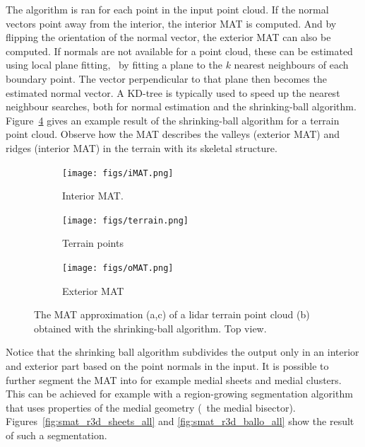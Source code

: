 The algorithm is ran for each point in the input point cloud. 
If the normal vectors point away from the interior, the interior MAT is computed.
And by flipping the orientation of the normal vector, the exterior MAT can also be computed.
If normals are not available for a point cloud, these can be estimated using local plane fitting, \ie\ by fitting a plane to the $k$ nearest neighbours of each boundary point. 
The vector perpendicular to that plane then becomes the estimated normal vector.
A KD-tree is typically used to speed up the nearest neighbour searches, both for normal estimation and the shrinking-ball algorithm.
Figure~\ref{fig:ca_ridge} gives an example result of the shrinking-ball algorithm for a terrain point cloud. 
Observe how the MAT describes the valleys (exterior MAT) and ridges (interior MAT) in the terrain with its skeletal structure.
\begin{figure}
	\centering
	\begin{subfigure}{0.310\linewidth}
		\texttt{[image: figs/iMAT.png]}
		\caption{Interior MAT.}
		\label{fig:ca_ridge:imat}
	\end{subfigure}
	\begin{subfigure}{0.310\linewidth}
		\texttt{[image: figs/terrain.png]}
		\caption{Terrain points}
		\label{fig:ca_ridge:terrain}
	\end{subfigure}
	\begin{subfigure}{0.310\linewidth}
		\texttt{[image: figs/oMAT.png]}
		\caption{Exterior MAT}
		\label{fig:ca_ridge:omat}
	\end{subfigure}
	\caption[The MAT approximation of a lidar terrain point cloud]{The MAT approximation (a,c) of a lidar terrain point cloud (b) obtained with the shrinking-ball algorithm. Top view.}
	\label{fig:ca_ridge}
\end{figure}

Notice that the shrinking ball algorithm subdivides the output only in an interior and exterior part based on the point normals in the input. 
It is possible to further segment the MAT into for example medial sheets and medial clusters.
This can be achieved for example with a region-growing segmentation algorithm that uses properties of the medial geometry (\eg\ the medial bisector). 
Figures~\ref{fig:smat_r3d_sheets_all} and \ref{fig:smat_r3d_ballo_all} show the result of such a segmentation.

